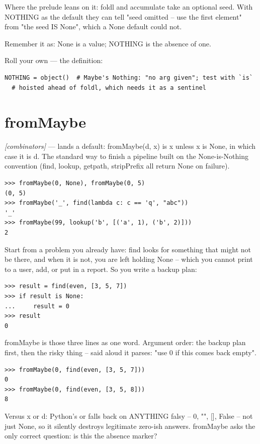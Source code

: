 \documentclass[11pt,letterpaper]{book}
\begin{document}
Where the prelude leans on it: foldl and accumulate take an optional seed. With NOTHING as the default they can tell "seed omitted -- use the first element" from "the seed IS None", which a None default could not.


Remember it as: None is a value; NOTHING is the absence of one.


Roll your own --- the definition:

\begin{lstlisting}[style=code]
NOTHING = object()  # Maybe's Nothing: "no arg given"; test with `is`
  # hoisted ahead of foldl, which needs it as a sentinel
\end{lstlisting}

\section{fromMaybe}
\noindent\textit{[combinators]} --- lands a default: fromMaybe(d, x) is x unless x is None, in which case it is d. The standard way to finish a pipeline built on the None-is-Nothing convention (find, lookup, getpath, stripPrefix all return None on failure).
\begin{lstlisting}[style=spec]
>>> fromMaybe(0, None), fromMaybe(0, 5)
(0, 5)
>>> fromMaybe('_', find(lambda c: c == 'q', "abc"))
'_'
>>> fromMaybe(99, lookup('b', [('a', 1), ('b', 2)]))
2
\end{lstlisting}

Start from a problem you already have: find looks for something that might not be there, and when it is not, you are left holding None -- which you cannot print to a user, add, or put in a report. So you write a backup plan:

\begin{lstlisting}[style=spec]
>>> result = find(even, [3, 5, 7])
>>> if result is None:
...     result = 0
>>> result
0
\end{lstlisting}

fromMaybe is those three lines as one word. Argument order: the backup plan first, then the risky thing -- said aloud it parses: "use 0 if this comes back empty".

\begin{lstlisting}[style=spec]
>>> fromMaybe(0, find(even, [3, 5, 7]))
0
>>> fromMaybe(0, find(even, [3, 5, 8]))
8
\end{lstlisting}

Versus x or d: Python's or falls back on ANYTHING falsy -- 0, "", [], False -- not just None, so it silently destroys legitimate zero-ish answers. fromMaybe asks the only correct question: is this the absence marker?
\end{document}

